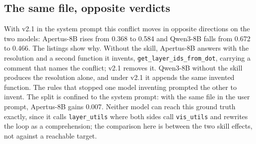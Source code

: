 

\subsection{The same file, opposite verdicts}

With v2.1 in the system prompt this conflict moves in opposite directions on the
two models: Apertus-8B rises from 0.368 to 0.584 and Qwen3-8B falls from 0.672 to
0.466. The listings show why. Without the skill, Apertus-8B answers with the
resolution and a second function it invents, \texttt{get\_layer\_ids\_from\_dot},
carrying a comment that names the conflict; v2.1 removes it. Qwen3-8B without the
skill produces the resolution alone, and under v2.1 it appends the same invented
function. The rules that stopped one model inventing prompted the other to invent.
The split is confined to the system prompt: with the same file in the user prompt,
Apertus-8B gains 0.007. Neither model can reach this ground truth exactly, since it
calls \texttt{layer\_utils} where both sides call \texttt{vis\_utils} and rewrites
the loop as a comprehension; the comparison here is between the two skill effects,
not against a reachable target.


